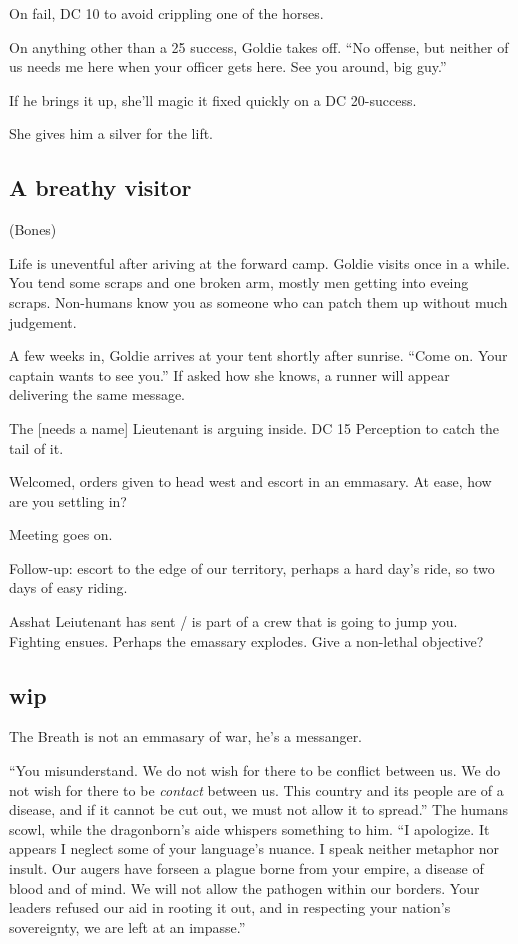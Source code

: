 \begin{multicols}{2}
On fail, DC 10 to avoid crippling one of the horses.

On anything other than a 25 success, Goldie takes off.
``No offense, but neither of us needs me here when your officer gets here.
See you around, big guy.''

If he brings it up, she'll magic it fixed quickly on a DC 20-success.

She gives him a silver for the lift.

\subsection{A breathy visitor}
(Bones)

Life is uneventful after ariving at the forward camp.
Goldie visits once in a while.
You tend some scraps and one broken arm, mostly men getting into eveing scraps.
Non-humans know you as someone who can patch them up without much judgement.

A few weeks in, Goldie arrives at your tent shortly after sunrise.
``Come on.
  Your captain wants to see you.''
If asked how she knows, a runner will appear delivering the same message.

The [needs a name] Lieutenant is arguing inside.
DC 15 Perception to catch the tail of it.

Welcomed, orders given to head west and escort in an emmasary.
At ease, how are you settling in?

Meeting goes on.

Follow-up: escort to the edge of our territory, perhaps a hard day's ride, so two days of easy
  riding.

Asshat Leiutenant has sent / is part of a crew that is going to jump you.
Fighting ensues.
Perhaps the emassary explodes.
Give a non-lethal objective?
\subsection{wip}

The Breath is not an emmasary of war, he's a messanger.

  \begin{aloud}
  ``You misunderstand.
    We do not wish for there to be conflict between us.
    We do not wish for there to be \emph{contact} between us.
    This country and its people are of a disease,
      and if it cannot be cut out, we must not allow it to spread.''
    The humans scowl, while the dragonborn's aide whispers something to him.
  ``I apologize.
    It appears I neglect some of your language's nuance.
    I speak neither metaphor nor insult.
    Our augers have forseen a plague borne from your empire, a disease of blood and of mind.
    We will not allow the pathogen within our borders.
    Your leaders refused our aid in rooting it out, and in respecting your nation's sovereignty,
      we are left at an impasse.''


\end{aloud}
\end{multicols}
